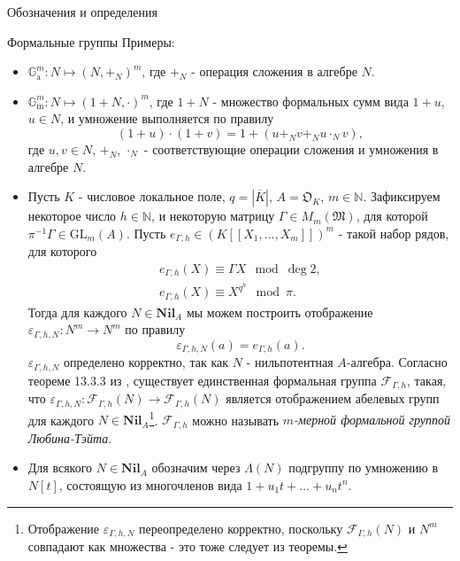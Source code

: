 \documentclass[a4paper,14pt]{extarticle}
\theoremstyle{definition}
\newcommand{\Nil}[1]{\mathbf{Nil}_{#1}}
\newcommand{\GL}[2]{\mathrm{GL}_{#1}\left(#2\right)}
\newcommand{\bG}{\mathbb{G}}
\newcommand{\bN}{\mathbb{N}}
\newcommand{\fM}{\mathfrak{M}}
\newcommand{\fO}{\mathfrak{O}}
\newcommand{\sF}{\mathscr{F}}
\newcommand{\Ga}{\bG_{\mathrm{a}}}
\newcommand{\Gm}{\bG_{\mathrm{m}}}
\begin{document}
\begin{section}{Обозначения и определения}
\begin{subsection}{Формальные группы}
Примеры:
\begin{itemize}
    \item ${ \Ga^m : N \mapsto (N, +_N)^m }$, где $+_N$ - операция сложения в алгебре $N$.
    \item ${ \Gm^m : N \mapsto (1 + N, \cdot)^m }$, где ${ 1 + N }$ - множество формальных сумм вида ${ 1 + u }$, ${ u \in N }$, и умножение выполняется по правилу
    \begin{equation*}
        (1 + u) \cdot (1 + v) =
        1 + (u +_N v +_N u \cdot_N v),
    \end{equation*}
    где ${ u, v \in N }$, $+_N$, $\cdot_N$ - соответствующие операции сложения и умножения в алгебре $N$.
    \item Пусть $K$ - числовое локальное поле, ${ q = |\overline{K}| }$, ${ A = \fO_K }$, ${ m \in \bN }$. Зафиксируем некоторое число ${ h \in \bN }$, и некоторую матрицу ${ \Gamma \in M_m(\fM) }$, для которой ${ \pi^{-1} \Gamma \in \GL{m}{A} }$. Пусть ${ e_{\Gamma, h} \in (K[[X_1, ..., X_m]])^m }$ - такой набор рядов, для которого
    \begin{gather*}
        e_{\Gamma, h}(X) \equiv \Gamma X \mod \deg 2, \\
        e_{\Gamma, h}(X) \equiv X^{q^h} \mod \pi.
    \end{gather*}
    Тогда для каждого ${ N \in \Nil{A} }$ мы можем построить отображение ${ \varepsilon_{\Gamma, h, N} : N^m \rightarrow N^m }$ по правилу
    \begin{equation*}
        \varepsilon_{\Gamma, h, N}(a) =
        e_{\Gamma, h}(a).
    \end{equation*}
    $\varepsilon_{\Gamma, h, N}$ определено корректно, так как $N$ - нильпотентная $A$-алгебра. Согласно теореме 13.3.3 из \cite{Hazewinkel}, существует единственная формальная группа $\sF_{\Gamma, h}$, такая, что ${ \varepsilon_{\Gamma, h, N} : \sF_{\Gamma, h}(N) \rightarrow \sF_{\Gamma, h}(N) }$ является отображением абелевых групп для каждого ${ N \in \Nil{A} }$\footnote{
        Отображение $\varepsilon_{\Gamma, h, N}$ переопределено корректно, поскольку $\sF_{\Gamma, h}(N)$ и $N^m$ совпадают как множества - это тоже следует из теоремы.
    }. $\sF_{\Gamma, h}$ можно называть \textit{$m$-мерной формальной группой Любина-Тэйта}.
    \item Для всякого ${ N \in \Nil{A} }$ обозначим через $\Lambda(N)$ подгруппу по умножению в ${ N[t] }$, состоящую из многочленов вида ${ 1 + u_1 t + ... + u_n t^n }$.
\end{itemize}


\end{subsection}
\end{section}
\end{document}
